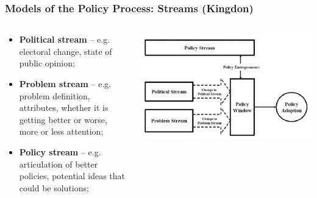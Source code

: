 \documentclass[aspectratio=169]{beamer}
\theoremstyle{principle}
\begin{document}
\begin{frame}
\frametitle{Models of the Policy Process: Streams (Kingdon)}
\begin{columns}
\begin{column}{0.5\textwidth}

\begin{itemize}
\item \textbf{Political stream} -- e.g. electoral change, state of public opinion;
\bigskip
\item \textbf{Problem stream} -- e.g. problem definition, attributes, whether it is getting better or worse, more or less attention;
\bigskip
\item \textbf{Policy stream} -- e.g. articulation of better policies, potential ideas that could be solutions;
\end{itemize}
\end{column}
\begin{column}{0.5\textwidth}

    \begin{center}
     \includegraphics[scale=0.3]{windows.png}
     \end{center}
\end{column}
\end{columns}

\end{frame}
\end{document}
